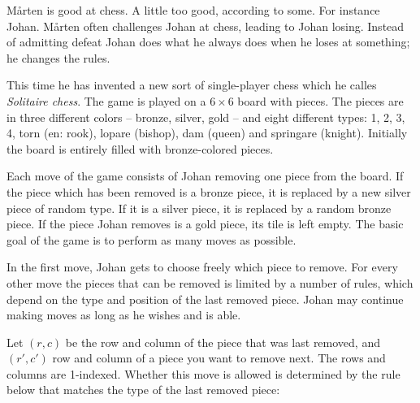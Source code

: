Mårten is good at chess. A little too good, according to some. For instance Johan. Mårten often challenges Johan at chess, leading to Johan losing. Instead of admitting defeat Johan does what he always does when he loses at something; he changes the rules.

This time he has invented a new sort of single-player chess which he calles \emph{Solitaire chess}.
The game is played on a $6 \times 6$ board with pieces. The pieces are in three different colors -- bronze, silver, gold -- and eight different types: 1, 2, 3, 4, torn (en: rook), lopare (bishop), dam (queen) and springare (knight). Initially the board is entirely filled with bronze-colored pieces.

Each move of the game consists of Johan removing one piece from the board. If the piece which has been removed is a bronze piece, it is replaced by a new silver piece of random type. If it is a silver piece, it is replaced by a random bronze piece. If the piece Johan removes is a gold piece, its tile is left empty.
The basic goal of the game is to perform as many moves as possible.

In the first move, Johan gets to choose freely which piece to remove. For every other move the pieces that can be removed is limited by a number of rules, which depend on the type and position of the last removed piece.
Johan may continue making moves as long as he wishes and is able.

Let $(r, c)$ be the row and column of the piece that was last removed, and $(r', c')$ row and column of a piece you want to remove next. The rows and columns are 1-indexed. Whether this move is allowed is determined by the rule below that matches the type of the last removed piece:

